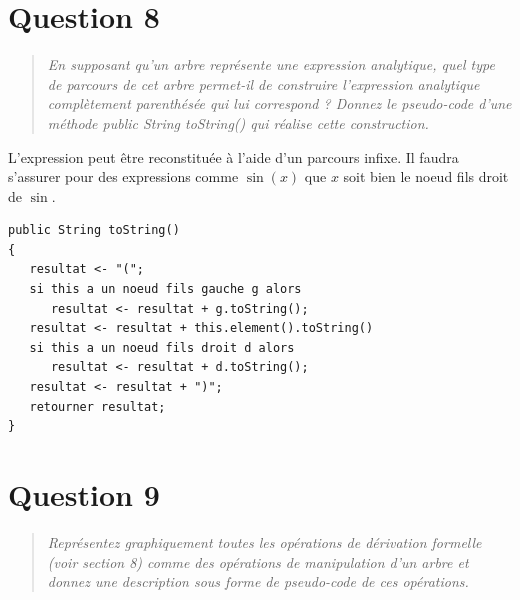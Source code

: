 \documentclass[11pt,a4paper]{article}
\begin{document}
\section{Question 8}
\begin{quotation}
\color{gray}\textit{En supposant qu’un arbre représente une expression analytique, quel type de parcours de cet arbre permet-il de construire l’expression analytique complètement
parenthésée qui lui correspond ? Donnez le pseudo-code d’une méthode public
String toString() qui réalise cette construction.}
\end{quotation}

L'expression peut être reconstituée à l'aide d'un parcours infixe. Il faudra s'assurer pour des expressions comme $\sin(x)$ que $x$ soit bien le noeud fils droit de $\sin$.

\begin{lstlisting}[caption=Pseudo-code d'une méthode public String toString()]
public String toString()
{
   resultat <- "(";
   si this a un noeud fils gauche g alors
      resultat <- resultat + g.toString();
   resultat <- resultat + this.element().toString()
   si this a un noeud fils droit d alors
      resultat <- resultat + d.toString();
   resultat <- resultat + ")";
   retourner resultat;
}
\end{lstlisting}

\section{Question 9}
\begin{quotation}
\color{gray}\textit{Représentez graphiquement toutes les opérations de dérivation formelle (voir section 8) comme des opérations de manipulation d’un arbre et donnez une description sous forme de pseudo-code de ces opérations.}
\end{quotation}
\end{document}
